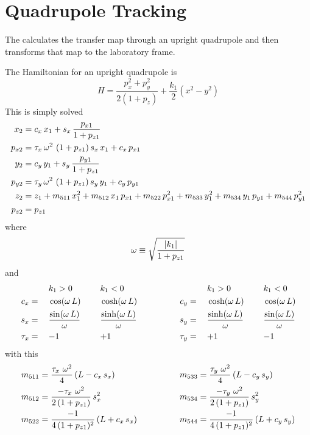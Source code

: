 \section{Quadrupole Tracking}
\label{s:quadrupole.std}

The  calculates the transfer map through an upright
quadrupole and then transforms that map to the laboratory frame.

The Hamiltonian for an upright quadrupole is
\begin{equation}
  H = \frac{p_x^2 + p_y^2}{2 (1 + p_z)} + \frac{k_1}{2} (x^2 - y^2)
\end{equation}
This is simply solved
\begin{align}
  x_2    &= c_x \, x_1 + s_x \, \frac{p_{x1}}{1 + p_{z1}} \nonumber \\
  p_{x2} &= \tau_x \, \omega^2 \, \, (1 + p_{z1}) \, s_x \, x_1 + c_x \, p_{x1} \nonumber \\
  y_2    &= c_y \, y_1 + s_y \, \frac{p_{y1}}{1 + p_{z1}} \nonumber \\
  p_{y2} &= \tau_y \, \omega^2 \, \, (1 + p_{z1}) \, s_y \, y_1 + c_y \, p_{y1} \\
  z_2    &= z_1 + m_{511} \, x_1^2 + m_{512} \, x_1 \, p_{x1} + m_{522} \, p_{x1}^2 + 
                   m_{533} \, y_1^2 + m_{534} \, y_1 \, p_{y1} + m_{544} \, p_{y1}^2 \nonumber \\
  p_{z2} &= p_{z1} \nonumber
\end{align}
where 
\begin{equation}
  \omega \equiv \sqrt{\frac{|k_1|}{1 + p_{z1}}}
\end{equation}
and
\begin{alignat}{6}
         &\hspace*{3ex}  && k_1 > 0          &\hspace*{3ex}& k_1 < 0 & \qquad \qquad
         &\hspace*{3ex}  && k_1 > 0          &\hspace*{3ex}& k_1 < 0 \nonumber \\
     c_x &=   && \cos  (\omega \, L) && \cosh (\omega \, L) & \qquad \qquad
     c_y &=   && \cosh (\omega \, L) && \cos  (\omega \, L) \nonumber \\
     s_x &=   && \frac{\sin  (\omega \, L)}{\omega} && \frac{\sinh (\omega \, L)}{\omega} & \qquad \qquad
     s_y &=   && \frac{\sinh (\omega \, L)}{\omega} && \frac{\sin  (\omega \, L)}{\omega} \\
  \tau_x &=   && {-}1             && {+}1             & \qquad \qquad
  \tau_y &=   && {+}1             && {-}1             \nonumber
\end{alignat}
with this
\begin{alignat}{2}
  m_{511} &= \frac{\tau_x \,\, \omega^2}{4} \, (L - c_x \, s_x) & \qquad \qquad
  m_{533} &= \frac{\tau_y \,\, \omega^2}{4} \, (L - c_y \, s_y) \nonumber \\
  m_{512} &= \frac{-\tau_x \,\, \omega^2}{2 \, (1 + p_{z1})} \, s_x^2 & \qquad \qquad
  m_{534} &= \frac{-\tau_y \,\, \omega^2}{2 \, (1 + p_{z1})} \, s_y^2 \\
  m_{522} &= \frac{-1}{4 \, (1 + p_{z1})^2} \, (L + c_x \, s_x) & \qquad \qquad
  m_{544} &= \frac{-1}{4 \, (1 + p_{z1})^2} \, (L + c_y \, s_y) \nonumber
\end{alignat}

